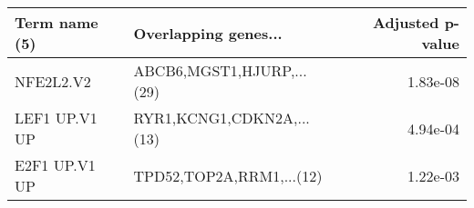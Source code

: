 \begin{tabular}{llr}
\toprule
Term name (5) &      Overlapping genes... &  Adjusted p-value \\
\midrule
    NFE2L2.V2 & ABCB6,MGST1,HJURP,...(29) &          1.83e-08 \\
LEF1 UP.V1 UP & RYR1,KCNG1,CDKN2A,...(13) &          4.94e-04 \\
E2F1 UP.V1 UP &  TPD52,TOP2A,RRM1,...(12) &          1.22e-03 \\
\bottomrule
\end{tabular}
